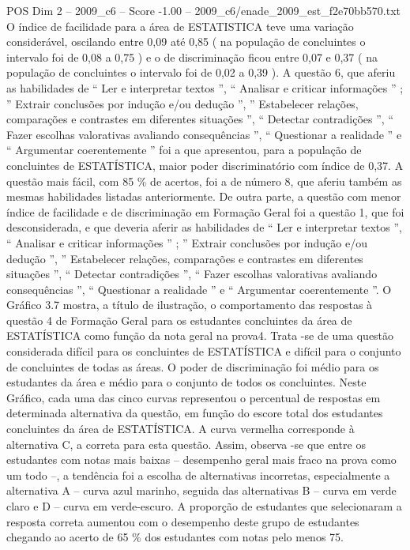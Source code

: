 \begin{textsample}{POS Dim 2 – 2009\_c6 – Score -1.00 – 2009\_c6/enade\_2009\_est\_f2e70bb570.txt}
O índice de facilidade para a área de ESTATISTICA teve uma variação considerável, oscilando entre 0,09 até 0,85 ( na população de concluintes o intervalo foi de 0,08 a 0,75 ) e o de discriminação ficou entre 0,07 e 0,37 ( na população de concluintes o intervalo foi de 0,02 a 0,39 ).
A questão 6, que aferiu as habilidades de “ Ler e interpretar textos ”, “ Analisar e criticar informações ” ; ” Extrair conclusões por indução e/ou dedução ”, ” Estabelecer relações, comparações e contrastes em diferentes situações ”, “ Detectar contradições ”, “ Fazer escolhas valorativas avaliando consequências ”, “ Questionar a realidade ” e “ Argumentar coerentemente ” foi a que apresentou, para a população de concluintes de ESTATÍSTICA, maior poder discriminatório com índice de 0,37.
A questão mais fácil, com 85 \% de acertos, foi a de número 8, que aferiu também as mesmas habilidades listadas anteriormente.
De outra parte, a questão com menor índice de facilidade e de discriminação em Formação Geral foi a questão 1, que foi desconsiderada, e que deveria aferir as habilidades de “ Ler e interpretar textos ”, “ Analisar e criticar informações ” ; ” Extrair conclusões por indução e/ou dedução ”, ” Estabelecer relações, comparações e contrastes em diferentes situações ”, “ Detectar contradições ”, “ Fazer escolhas valorativas avaliando consequências ”, “ Questionar a realidade ” e “ Argumentar coerentemente ”.
O Gráfico 3.7 mostra, a título de ilustração, o comportamento das respostas à questão 4 de Formação Geral para os estudantes concluintes da área de ESTATÍSTICA como função da nota geral na prova4.
Trata -se de uma questão considerada difícil para os concluintes de ESTATÍSTICA e difícil para o conjunto de concluintes de todas as áreas.
O poder de discriminação foi médio para os estudantes da área e médio para o conjunto de todos os concluintes.
Neste Gráfico, cada uma das cinco curvas representou o percentual de respostas em determinada alternativa da questão, em função do escore total dos estudantes concluintes da área de ESTATÍSTICA.
A curva vermelha corresponde à alternativa C, a correta para esta questão.
Assim, observa -se que entre os estudantes com notas mais baixas – desempenho geral mais fraco na prova como um todo –, a tendência foi a escolha de alternativas incorretas, especialmente a alternativa A – curva azul marinho, seguida das alternativas B – curva em verde claro e D – curva em verde-escuro.
A proporção de estudantes que selecionaram a resposta correta aumentou com o desempenho deste grupo de estudantes chegando ao acerto de 65 \% dos estudantes com notas pelo menos 75.

\end{textsample}
